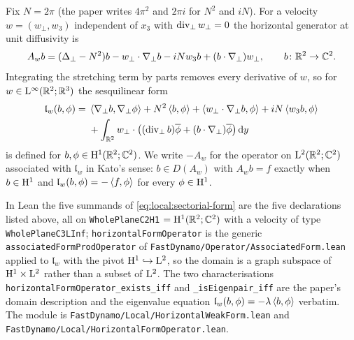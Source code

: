 \begin{definition}
  \label{def:local:horizontal-operator}
  \leanok
  Fix $N=2\pi$ (the paper writes $4\pi^2$ and $2\pi i$ for $N^2$ and $iN$).  For a velocity $w=(w_\perp,w_3)$ independent of $x_3$ with
  $\operatorname{div}_\perp w_\perp=0$ the horizontal generator at unit diffusivity is
  \begin{equation}
    A_wb=(\Delta_\perp-N^2)b-w_\perp\cdot\nabla_\perp b-iNw_3b
      +(b\cdot\nabla_\perp)w_\perp,
    \qquad b\colon\mathbb{R}^2\to\mathbb{C}^2 .
    \label{eq:local:horizontal-induction}
  \end{equation}
  Integrating the stretching term by parts removes every derivative of $w$, so for
  $w\in\mathrm{L}^\infty(\mathbb{R}^2;\mathbb{R}^3)$ the sesquilinear form
  \begin{align}
    \mathfrak l_w(b,\phi)
    ={}&\left\langle\nabla_\perp b,\nabla_\perp\phi\right\rangle+N^2\left\langle b,\phi\right\rangle
       +\left\langle w_\perp\cdot\nabla_\perp b,\phi\right\rangle+iN\left\langle w_3b,\phi\right\rangle\notag\\
      &+\int_{\mathbb{R}^2}w_\perp\cdot
        \bigl((\operatorname{div}_\perp b)\overline\phi+(b\cdot\nabla_\perp)\overline\phi\bigr)\,\mathrm{d} y
    \label{eq:local:sectorial-form}
  \end{align}
  is defined for $b,\phi\in\mathrm{H}^1(\mathbb{R}^2;\mathbb{C}^2)$.  We write $-A_w$ for the operator on
  $\mathrm{L}^2(\mathbb{R}^2;\mathbb{C}^2)$ associated with $\mathfrak l_w$ in Kato's sense: $b\in D(A_w)$ with
  $A_wb=f$ exactly when $b\in\mathrm{H}^1$ and $\mathfrak l_w(b,\phi)=-\left\langle f,\phi\right\rangle$ for every
  $\phi\in\mathrm{H}^1$.
\end{definition}

In Lean the five summands of \eqref{eq:local:sectorial-form} are the five declarations
listed above, all on \texttt{WholePlaneC2H1} $=\mathrm{H}^1(\mathbb{R}^2;\mathbb{C}^2)$ with a velocity of type
\texttt{WholePlaneC3LInf}; \texttt{horizontalFormOperator} is the generic
\texttt{associatedFormProdOperator} of \texttt{FastDynamo/Operator/AssociatedForm.lean}
applied to $\mathfrak l_w$ with the pivot $\mathrm{H}^1\hookrightarrow\mathrm{L}^2$, so the domain is a
graph subspace of $\mathrm{H}^1\times\mathrm{L}^2$ rather than a subset of $\mathrm{L}^2$.  The two
characterisations \texttt{horizontalFormOperator\_exists\_iff} and
\texttt{\_isEigenpair\_iff} are the paper's domain description and the eigenvalue
equation $\mathfrak l_w(b,\phi)=-\lambda\left\langle b,\phi\right\rangle$ verbatim.  The module is
\texttt{FastDynamo/Local/HorizontalWeakForm.lean} and
\texttt{FastDynamo/Local/HorizontalFormOperator.lean}.

